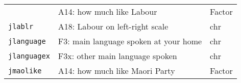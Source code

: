 \documentclass[]{article}
\begin{document}
\begin{longtable}[]{@{}lll@{}}
\begin{minipage}[t]{0.14\columnwidth}
\end{minipage} & \begin{minipage}[t]{0.70\columnwidth}\raggedright\strut
A14: how much like Labour\strut
\end{minipage} & \begin{minipage}[t]{0.08\columnwidth}\raggedright\strut
Factor\strut
\end{minipage}\tabularnewline
\begin{minipage}[t]{0.14\columnwidth}\raggedright\strut
\texttt{jlablr}\strut
\end{minipage} & \begin{minipage}[t]{0.70\columnwidth}\raggedright\strut
A18: Labour on left-right scale\strut
\end{minipage} & \begin{minipage}[t]{0.08\columnwidth}\raggedright\strut
chr\strut
\end{minipage}\tabularnewline
\begin{minipage}[t]{0.14\columnwidth}\raggedright\strut
\texttt{jlanguage}\strut
\end{minipage} & \begin{minipage}[t]{0.70\columnwidth}\raggedright\strut
F3: main language spoken at your home\strut
\end{minipage} & \begin{minipage}[t]{0.08\columnwidth}\raggedright\strut
chr\strut
\end{minipage}\tabularnewline
\begin{minipage}[t]{0.14\columnwidth}\raggedright\strut
\texttt{jlanguagex}\strut
\end{minipage} & \begin{minipage}[t]{0.70\columnwidth}\raggedright\strut
F3x: other main language spoken\strut
\end{minipage} & \begin{minipage}[t]{0.08\columnwidth}\raggedright\strut
chr\strut
\end{minipage}\tabularnewline
\begin{minipage}[t]{0.14\columnwidth}\raggedright\strut
\texttt{jmaolike}\strut
\end{minipage} & \begin{minipage}[t]{0.70\columnwidth}\raggedright\strut
A14: how much like Maori Party\strut
\end{minipage} & \begin{minipage}[t]{0.08\columnwidth}\raggedright\strut
Factor\strut
\end{minipage}\tabularnewline

\end{longtable}
\end{document}
